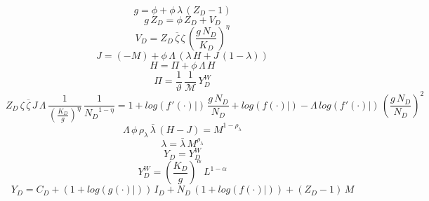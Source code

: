 \documentclass[10pt,a4paper]{article}
\begin{document}
\footnotesize
\begin{dmath}
{g}=\phi+\phi\, {\lambda}\, \left({Z_D}-1\right)
\end{dmath}
\begin{dmath}
{g}\, {Z_D}=\phi\, {Z_D}+{V_D}
\end{dmath}
\begin{dmath}
{V_D}={Z_D}\, \overline{\zeta}\, {\zeta}\, \left(\frac{{g}\, {N_D}}{{K_D}}\right)^{\eta}
\end{dmath}
\begin{dmath}
{J}=\left(-{M}\right)+\phi\, {\Lambda}\, \left({\lambda}\, {H}+{J}\, \left(1-{\lambda}\right)\right)
\end{dmath}
\begin{dmath}
{H}={\Pi}+\phi\, {\Lambda}\, {H}
\end{dmath}
\begin{dmath}
{\Pi}=\frac{1}{\vartheta}\, \frac{1}{\mathcal{M}}\, {Y^W_D}
\end{dmath}
\begin{dmath}
{Z_D}\, {\zeta}\, \overline{\zeta}\, {J}\, {\Lambda}\, \frac{1}{\left(\frac{{K_D}}{{g}}\right)^{\eta}}\, \frac{1}{{N_D}^{1-\eta}}=1+log\left({\left.       f^‎{\prime}\left( \cdot \right)   \right|}\right)\, \frac{{g}\, {N_D}}{{N_D}}+log\left({\left.       f\left( \cdot \right)            \right|}\right)-{\Lambda}\, log\left({\left.       f^‎{\prime}\left( \cdot \right)   \right|}\right)\, \left(\frac{{g}\, {N_D}}{{N_D}}\right)^{2}
\end{dmath}
\begin{dmath}
{\Lambda}\, \phi\, {\rho_\lambda}\, {\bar{\lambda}}\, \left({H}-{J}\right)={M}^{1-{\rho_\lambda}}
\end{dmath}
\begin{dmath}
{\lambda}={\bar{\lambda}}\, {M}^{{\rho_\lambda}}
\end{dmath}
\begin{dmath}
{Y_D}={Y^W_D}
\end{dmath}
\begin{dmath}
{Y^W_D}=\left(\frac{{K_D}}{{g}}\right)^{\alpha}\, {L}^{1-\alpha}
\end{dmath}
\begin{dmath}
{Y_D}={C_D}+\left(1+log\left({\left.       g\left( \cdot \right)            \right|}\right)\right)\, {I_D}+{N_D}\, \left(1+log\left({\left.       f\left( \cdot \right)            \right|}\right)\right)+\left({Z_D}-1\right)\, {M}
\end{dmath}
\end{document}
